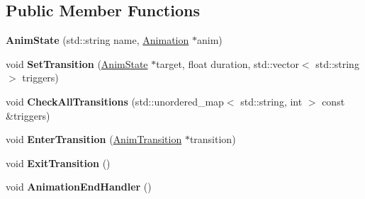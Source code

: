 \subsection*{Public Member Functions}
\begin{DoxyCompactItemize}
\item 
\mbox{\label{structAnimState_aade1f3a6b816a8ca9848891d9907a3b0}} 
{\bfseries Anim\+State} (std\+::string name, \hyperlink{structAnimation}{Animation} $\ast$anim)
\item 
\mbox{\label{structAnimState_a3f768e0e2231e5ef88cc5c99ba504530}} 
void {\bfseries Set\+Transition} (\hyperlink{structAnimState}{Anim\+State} $\ast$target, float duration, std\+::vector$<$ std\+::string $>$ triggers)
\item 
\mbox{\label{structAnimState_a837a54cacb32a66f5b6820c70a1b4087}} 
void {\bfseries Check\+All\+Transitions} (std\+::unordered\+\_\+map$<$ std\+::string, int $>$ const \&triggers)
\item 
\mbox{\label{structAnimState_aceb8e4d8277433e1963513e09efdfd13}} 
void {\bfseries Enter\+Transition} (\hyperlink{structAnimTransition}{Anim\+Transition} $\ast$transition)
\item 
\mbox{\label{structAnimState_a9cf2327df0e266aa2b0b997cb657e8c7}} 
void {\bfseries Exit\+Transition} ()
\item 
\mbox{\label{structAnimState_aa7ce8cb621dc185ff1b95548b286f6a1}} 
void {\bfseries Animation\+End\+Handler} ()
\end{DoxyCompactItemize}
